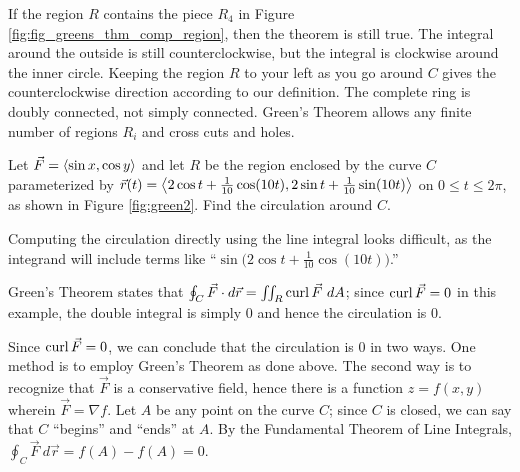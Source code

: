 If the region $R$ contains the piece $R_4$ in Figure \ref{fig:fig_greens_thm_comp_region}, then the theorem is still true. The
integral around the outside is still counterclockwise, but the integral is clockwise around the inner circle. Keeping the region $R$ to your left as you go around $C$ gives the counterclockwise direction according to our definition. The complete ring is doubly connected, not simply connected. Green's Theorem allows any finite number of regions $R_i$ and cross cuts and holes.\\


{Let $\vec F = \left\langle \sin x,\cos y\right\rangle$ and let $R$ be the region enclosed by the curve $C$ parameterized by $\vec r(t) = \left\langle 2\cos t+ \frac1{10}\cos(10t),2\sin t+\frac1{10}\sin(10t)\right\rangle$ on $0\leq t\leq 2\pi$, as shown in Figure \ref{fig:green2}. Find the circulation around $C$.
}
{Computing the circulation directly using the line integral looks difficult, as the integrand will include terms like ``$\sin\big(2\cos t + \frac1{10}\cos(10t)\big)$.'' 

Green's Theorem states that $\oint_C\vec F\cdot d\vec r = \iint_R \operatorname{curl}\vec F\ dA$; since $\operatorname{curl} \vec F = 0$ in this example, the double integral is simply 0 and hence the circulation is 0.

Since $\operatorname{curl} \vec F = 0$, we can conclude that the circulation is 0 in two ways. One method is to employ Green's Theorem as done above. The second way is to recognize that $\vec F$ is a conservative field, hence there is a function $z=f(x,y)$ wherein $\vec F = \nabla f$. Let $A$ be any point on the curve $C$; since $C$ is closed, we can say that $C$ ``begins'' and ``ends'' at $A$. By the Fundamental Theorem of Line Integrals, $\oint_C \vec F\ d\vec r = f(A)-f(A) = 0$.\vskip-6pt
}\\

